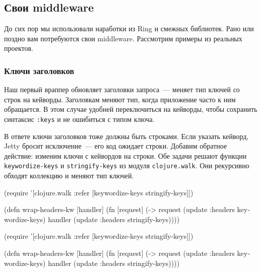 \subsection{Свои middleware}


До сих пор мы использовали наработки из Ring и смежных библиотек. Рано или
поздно вам потребуются свои middleware. Рассмотрим примеры из реальных проектов.

\subsubsection*{Ключи заголовков}

\label{wrap-headers-kw}

Наш первый враппер обновляет заголовки запроса~--- меняет тип ключей со строк на
кейворды. Заголовкам меняют тип, когда приложение часто к ним обращается. В этом
случае удобней переключиться на кейворды, чтобы сохранить синтаксис \verb|:keys|
и не ошибиться с типом ключа.


В ответе ключи заголовков тоже должны быть строками. Если указать кейворд, Jetty
бросит исключение~--- его код ожидает строки. Добавим обратное действие: изменим
ключи с кейвордов на строки. Обе задачи решают функции \verb|keywordize-keys| и
\verb|stringify-keys| из модуля \verb|clojure.walk|. Они рекурсивно обходят
коллекцию и меняют тип ключей.


\ifnarrow

\begin{english}
  \begin{clojure}
(require
 '[clojure.walk :refer [keywordize-keys
                        stringify-keys]])

(defn wrap-headers-kw [handler]
  (fn [request]
    (-> request
        (update :headers keywordize-keys)
        handler
        (update :headers
                stringify-keys))))
  \end{clojure}
\end{english}

\else

\begin{english}
  \begin{clojure}
(require '[clojure.walk :refer
           [keywordize-keys stringify-keys]])

(defn wrap-headers-kw [handler]
  (fn [request]
    (-> request
        (update :headers keywordize-keys)
        handler
        (update :headers stringify-keys))))
  \end{clojure}
\end{english}

